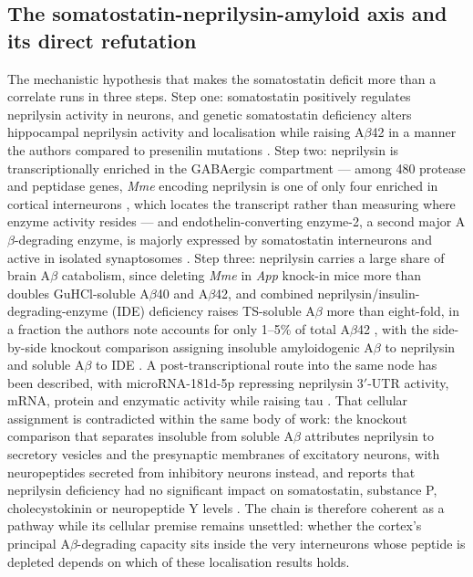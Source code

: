 \documentclass[11pt]{article}
\begin{document}
\subsection{The somatostatin-neprilysin-amyloid axis and its direct refutation}
\label{sec-04-neprilysin-axis}

The mechanistic hypothesis that makes the somatostatin deficit more than a correlate runs in three steps. Step one: somatostatin positively regulates neprilysin activity in neurons, and genetic somatostatin deficiency alters hippocampal neprilysin activity and localisation while raising A$\beta$42 in a manner the authors compared to presenilin mutations \citep{Saito2005}. Step two: neprilysin is transcriptionally enriched in the GABAergic compartment --- among 480 protease and peptidase genes, \emph{Mme} encoding neprilysin is one of only four enriched in cortical interneurons \citep{Rossier2014}, which locates the transcript rather than measuring where enzyme activity resides --- and endothelin-converting enzyme-2, a second major A$\beta$-degrading enzyme, is majorly expressed by somatostatin interneurons and active in isolated synaptosomes \citep{PachecoQuinto2016}. Step three: neprilysin carries a large share of brain A$\beta$ catabolism, since deleting \emph{Mme} in \emph{App} knock-in mice more than doubles GuHCl-soluble A$\beta$40 and A$\beta$42, and combined neprilysin/insulin-degrading-enzyme (IDE) deficiency raises TS-soluble A$\beta$ more than eight-fold, in a fraction the authors note accounts for only 1--5\% of total A$\beta$42 \citep{Morito2025}, with the side-by-side knockout comparison assigning insoluble amyloidogenic A$\beta$ to neprilysin and soluble A$\beta$ to IDE \citep{Sasaguri2021}. A post-transcriptional route into the same node has been described, with microRNA-181d-5p repressing neprilysin 3$'$-UTR activity, mRNA, protein and enzymatic activity while raising tau \citep{Wang2026}. That cellular assignment is contradicted within the same body of work: the knockout comparison that separates insoluble from soluble A$\beta$ attributes neprilysin to secretory vesicles and the presynaptic membranes of excitatory neurons, with neuropeptides secreted from inhibitory neurons instead, and reports that neprilysin deficiency had no significant impact on somatostatin, substance P, cholecystokinin or neuropeptide Y levels \citep{Sasaguri2021}. The chain is therefore coherent as a pathway while its cellular premise remains unsettled: whether the cortex's principal A$\beta$-degrading capacity sits inside the very interneurons whose peptide is depleted depends on which of these localisation results holds.
\end{document}
